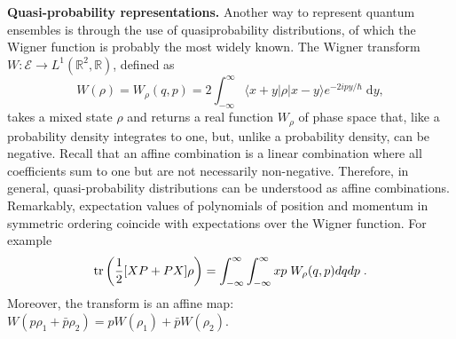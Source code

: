 \documentclass[10pt,twocolumn, nofootinbib]{revtex4-2}
\newcommand{\Ens}[1][E] {\mathcal{#1}} %
\begin{document}




\textbf{Quasi-probability representations.} Another way to represent quantum ensembles is through the use of quasiprobability distributions, of which the Wigner function is probably the most widely known. The Wigner transform $W : \Ens \to L^1(\mathbb{R}^2, \mathbb{R}) $, defined as \cite[eq.~11.8-3a]{mandel1995}
\begin{equation}
	W(\rho) = W_{\rho} (q, p) = 2 \int_{-\infty}^{\infty} \langle x + y | \rho | x - y \rangle e^{-2 i p y / \hbar} \; \mathrm dy,
\end{equation}
takes a mixed state $\rho$ and returns a real function $W_{\rho}$ of phase space that, like a probability density integrates to one, but, unlike a probability density, can be negative. Recall that an affine combination is a linear combination where all coefficients sum to one but are not necessarily non-negative. Therefore, in general, quasi-probability distributions can be understood as affine combinations. Remarkably, expectation values of polynomials of position and momentum in symmetric ordering coincide with expectations over the Wigner function. For example
\begin{equation}
	\operatorname{tr} \left( \frac{1}{2}[XP+PX] \rho \right) = \int_{-\infty}^{\infty} \int_{-\infty}^{\infty} xp \; W_{\rho} (q, p) dq dp \; .
\end{equation}
Moreover, the transform is an affine map: $W(p \rho_1 + \bar{p} \rho_2 ) = p W(\rho_1) + \bar{p} W(\rho_2)$.
\end{document}
